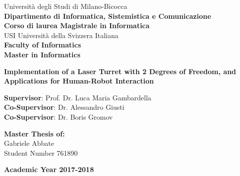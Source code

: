 \documentclass[a4paper,12pt,twoside,openright]{book}
\newcommand{\titolo}{Implementation of a Laser Turret with 2 Degrees of Freedom, and Applications for Human-Robot Interaction}
\newcommand{\autore}{Gabriele Abbate}
\newcommand{\matricola}{761890}
\newcommand{\relatore}{Prof. Dr. Luca Maria Gambardella}
\newcommand{\correlatoreA}{Dr. Alessandro Giusti}
\newcommand{\correlatoreB}{Dr. Boris Gromov}
\begin{document}
\begin{titlepage}
\begin{minipage}{0.67\linewidth}
\begin{flushleft}
			{\large Università degli Studi di Milano-Bicocca} \\[0.4cm]
			{\large \bfseries Dipartimento di Informatica, Sistemistica e Comunicazione} \\[0.4cm]
			{\large  \bfseries Corso di laurea Magistrale in Informatica}\\
			\vspace*{1.5cm}
			{\large USI Università della Svizzera Italiana} \\[0.4cm]
			{\large \bfseries Faculty of Informatics} \\[0.4cm]
			{\large  \bfseries Master in Informatics}
		\end{flushleft}
	\end{minipage}
	\begin{center}
		\vspace*{4cm}
		{ \huge \bfseries \titolo} \\[0.1cm]
	\end{center}
	\vspace*{2cm}
	\begin{flushleft}
		{\Large \textbf{Supervisor}: \relatore} \\[0.4cm]
		{\Large \textbf{Co-Supervisor}: \correlatoreA} \\[0.4cm]
		{\Large \textbf{Co-Supervisor}: \correlatoreB} \\[0.4cm]
	\end{flushleft}
	\vspace*{2cm}
	\begin{flushright}
		{\Large \textbf{Master Thesis of:}} \\[0.4cm]
		{\Large \autore} \\[0.2cm]
		{\Large Student Number \matricola} \\
	\end{flushright}
	\vfill
	\begin{center}
		{\Large \textbf{Academic Year 2017-2018}}
		\vspace*{1cm}
	\end{center}
	
\end{titlepage}

\restoregeometry	


\end{document}
